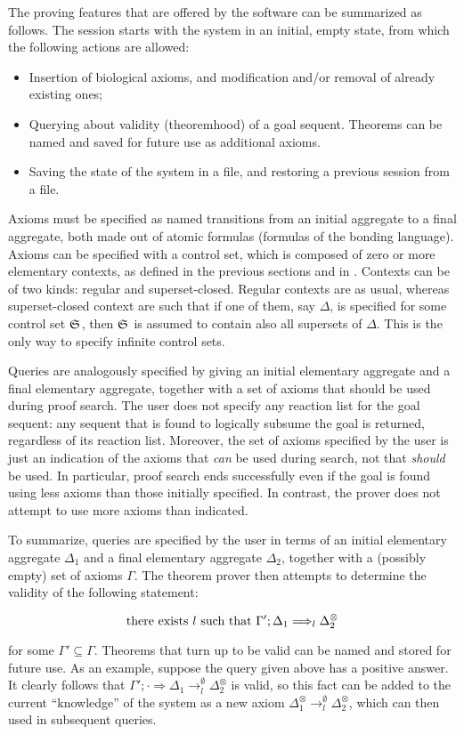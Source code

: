 The proving features that are offered by the software can be summarized as
follows. The session starts with the system in an initial, empty state, from
which the following actions are allowed:

\begin{itemize}
\item Insertion of biological axioms, and modification and/or removal of
  already existing ones;
\item Querying about validity (theoremhood) of a goal sequent.
  Theorems can be named and saved for future use as additional axioms.
\item Saving the state of the system in a file, and restoring a previous session
  from a file.
\end{itemize}

Axioms must be specified as named transitions from an initial aggregate to a
final aggregate, both made out of atomic formulas (formulas of the bonding
language). Axioms can be specified with a control set, which is composed of zero
or more elementary contexts, as defined in the previous sections and in
\cite{adding-logic}. Contexts can be of two kinds: regular and superset-closed.
Regular contexts are as usual, whereas superset-closed context are such that if
one of them, say $\Delta$, is specified for some control set $\mathfrak{S}_{}$, then
$\mathfrak{S}_{}$ is assumed to contain also all supersets of $\Delta$. This is the
only way to specify infinite control sets.

Queries are analogously specified by giving an initial elementary aggregate and
a final elementary aggregate, together with a set of axioms that should be used
during proof search. The user does not specify any reaction list for the goal
sequent: any sequent that is found to logically subsume the goal is returned,
regardless of its reaction list. Moreover, the set of axioms specified by the
user is just an indication of the axioms that \emph{can} be used during search,
not that \emph{should} be used. In particular, proof search ends successfully
even if the goal is found using less axioms than those initially specified. In
contrast, the prover does not attempt to use more axioms than indicated.

To summarize, queries are specified by the user in terms of an initial
elementary aggregate $\Delta_1$ and a final elementary aggregate $\Delta_2$,
together with a (possibly empty) set of axioms $\Gamma$. The theorem prover then
attempts to determine the validity of the following statement:

\[
  \text{there exists } l \text{ such that }
  \Gamma' ; \Delta_1 \Longrightarrow_{l} \Delta_2^{\otimes}
\]

for some $\Gamma' \subseteq \Gamma$. Theorems that turn up to be valid can be
named and stored for future use. As an example, suppose the query given above
has a positive answer. It clearly follows that
$\Gamma' ; \cdot \Longrightarrow \Delta_1 \rightarrow^{\emptyset}_l
\Delta_2^{\otimes}$ is valid, so this fact can be added to the current
``knowledge'' of the system as a new axiom
$\Delta_1^{\otimes} \rightarrow_l^{\emptyset} \Delta_2^{\otimes}$, which can then
used in subsequent queries.

